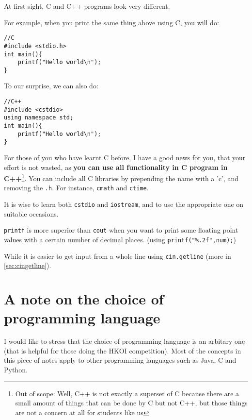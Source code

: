 At first sight, C and C++ programs look very different.

For example, when you print the same thing above using C, you will do:

\begin{lstlisting}
//C
#include <stdio.h> 
int main(){
    printf("Hello world\n");
}
\end{lstlisting}

To our surprise, we can also do:

\begin{lstlisting}
//C++
#include <cstdio>
using namespace std;
int main(){
    printf("Hello world\n");
}
\end{lstlisting}

For those of you who have learnt C before, I have a good news for you, that your effort is not wasted, as \textbf{you can use all functionality in C program in C++}\footnote{Out of scope: Well, C++ is not exactly a superset of C because there are a small amount of things that can be done by C but not C++, but those things are not a concern at all for students like us}. You can include all C libraries by prepending the name with a 'c', and removing the \texttt{.h}. For instance, \texttt{cmath} and \texttt{ctime}.
\vspace{6mm}

It is wise to learn both \texttt{cstdio} and \texttt{iostream}, and to use the appropriate one on suitable occasions.

\texttt{printf} is more superior than \texttt{cout} when you want to print some floating point values with a certain number of decimal places. (using \texttt{printf("\%.2f",num);})

While it is easier to get input from a whole line using \texttt{cin.getline} (more in \cref{sec:cingetline}).

\section{A note on the choice of programming language}

I would like to stress that the choice of programming language is an arbitary one (that is helpful for those doing the HKOI competition). Most of the concepts in this piece of notes apply to other programming languages such as Java, C and Python.